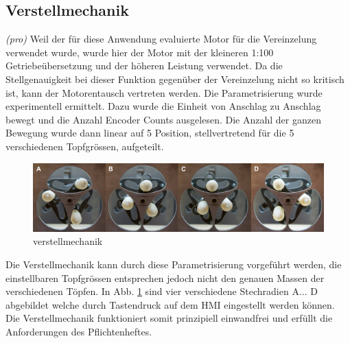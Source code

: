 \subsection{Verstellmechanik} \label{sec:Inbetriebnahme_Verstellmechanik}
\textit{(pro)} Weil der für diese Anwendung evaluierte Motor für die Vereinzelung verwendet wurde, wurde hier der Motor mit der kleineren 1:100 Getriebeübersetzung und der höheren Leistung verwendet. Da die Stellgenauigkeit bei dieser Funktion gegenüber der Vereinzelung nicht so kritisch ist, kann der Motorentausch vertreten werden. Die Parametrisierung wurde experimentell ermittelt. Dazu wurde die Einheit von Anschlag zu Anschlag bewegt und die Anzahl Encoder Counts ausgelesen. Die Anzahl der ganzen Bewegung wurde dann linear auf 5 Position, stellvertretend für die 5 verschiedenen Topfgrössen, aufgeteilt. 

\begin{figure}[H]
	\includegraphics[width=1\textwidth]{Illustrationen/7-Inbetriebnahme_und_Kalibration/verstellmechanik_1.jpg}
	\caption{verstellmechanik}
	\label{fig:verstellmechanik}
\end{figure}

Die Verstellmechanik kann durch diese Parametrisierung vorgeführt werden, die einstellbaren Topfgrössen entsprechen jedoch nicht den genauen Massen der verschiedenen Töpfen. In Abb. \ref{fig:verstellmechanik} sind vier verschiedene Stechradien A... D abgebildet welche durch Tastendruck auf dem HMI eingestellt werden können.
\newline
Die Verstellmechanik funktioniert somit prinzipiell einwandfrei und erfüllt die Anforderungen des Pflichtenheftes.
